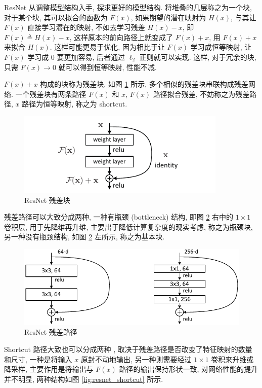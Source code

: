 \documentclass[12pt]{article}
\begin{document}
ResNet 从调整模型结构入手, 探求更好的模型结构. 将堆叠的几层称之为一个块, 对于某个块, 其可以拟合的函数为 $F(x)$, 如果期望的潜在映射为 $H(x)$, 与其让 $F(x)$ 直接学习潜在的映射, 不如去学习残差 $H(x)-x$, 即 $F(x)\triangleq H(x)-x$, 这样原本的前向路径上就变成了 $F(x)+x$, 用 $F(x)+x$ 来拟合 $H(x)$. 这样可能更易于优化, 因为相比于让 $F(x)$ 学习成恒等映射, 让 $F(x)$ 学习成 0 要更加容易, 后者通过 $\ell_2$ 正则就可以实现. 这样, 对于冗余的块, 只需 $F(x)\rightarrow 0$ 就可以得到恒等映射, 性能不减. 

$F(x)+x$ 构成的块称为残差块, 如图 \ref{fig:resnet} 所示, 多个相似的残差块串联构成残差网络. 一个残差块有两条路径 $F(x)$ 和 $x$, $F(x)$ 路径拟合残差, 不妨称之为残差路径, $x$ 路径为恒等映射, 称之为 shortcut. 

\begin{figure}[htbp]
  \centering
  \includegraphics[width=10cm]{block.pdf}
  \caption{ResNet 残差块}
  \label{fig:resnet}
\end{figure}

残差路径可以大致分成两种, 一种有瓶颈 (bottleneck) 结构, 即图 \ref{fig:resnet_function} 右中的 $1\times1$ 卷积层, 用于先降维再升维, 主要出于降低计算复杂度的现实考虑, 称之为瓶颈块, 另一种没有瓶颈结构, 如图 \ref{fig:resnet_function} 左所示, 称之为基本块. 

\begin{figure}[htbp]
  \centering
  \includegraphics[width=12cm]{block_deeper.pdf}
  \caption{ResNet 残差路径}
  \label{fig:resnet_function}
\end{figure}

Shortcut 路径大致也可以分成两种 \cite{Zhang2020Dive}, 取决于残差路径是否改变了特征映射的数量和尺寸, 一种是将输入 $x$ 原封不动地输出, 另一种则需要经过 $1\times1$ 卷积来升维或降采样, 主要作用是将输出与 $F(x)$ 路径的输出保持形状一致, 对网络性能的提升并不明显, 两种结构如图 \ref{fig:resnet_shortcut} 所示.
\end{document}
